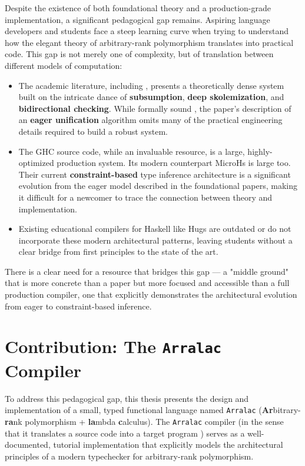Despite the existence of both foundational theory and a production-grade implementation, a significant pedagogical gap remains. Aspiring language developers and students face a steep learning curve when trying to understand how the elegant theory of arbitrary-rank polymorphism translates into practical code. This gap is not merely one of complexity, but of translation between different models of computation:
\begin{itemize}
    \item The academic literature, including \cite{jones-practical-2007}, presents a theoretically dense system built on the intricate dance of \textbf{subsumption}, \textbf{deep skolemization}, and \textbf{bidirectional checking}. While formally sound \cite{practical-type-inference-proofs}, the paper's description of an \textbf{eager unification} algorithm omits many of the practical engineering details required to build a robust system.
    \item The GHC source code, while an invaluable resource, is a large, highly-optimized production system. Its modern counterpart MicroHs \cite{augustsson-microhs-2024} \cite{augustss-microhs-2025} is large too. Their current \textbf{constraint-based} type inference architecture is a significant evolution from the eager model described in the foundational papers, making it difficult for a newcomer to trace the connection between theory and implementation.
    \item Existing educational compilers for Haskell like Hugs \cite{hugs-haskell} are outdated or do not incorporate these modern architectural patterns, leaving students without a clear bridge from first principles to the state of the art.
\end{itemize}
There is a clear need for a resource that bridges this gap --- a "middle ground" that is more concrete than a paper but more focused and accessible than a full production compiler, one that explicitly demonstrates the architectural evolution from eager to constraint-based inference.

\section{Contribution: The \texttt{Arralac} Compiler}


To address this pedagogical gap, this thesis presents the design and implementation of a small, typed functional language named \texttt{Arralac} (\textbf{Ar}bitrary-\textbf{ra}nk polymorphism + \textbf{la}mbda \textbf{c}alculus). The \texttt{Arralac} compiler (in the sense that it translates a source code into a target program \cite{10.5555/1177220}) serves as a well-documented, tutorial implementation that explicitly models the architectural principles of a modern typechecker for arbitrary-rank polymorphism.

